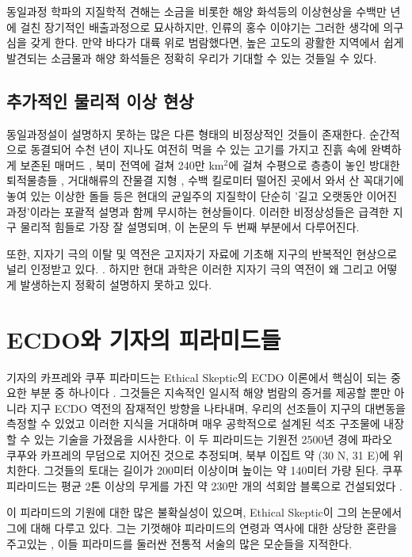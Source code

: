 \documentclass[10pt,twocolumn,letterpaper]{article}
\begin{document}
동일과정 학파의 지질학적 견해는 소금을 비롯한 해양 화석등의 이상현상을 수백만 년에 걸친 장기적인 배출과정으로 묘사하지만, 인류의 홍수 이야기는 그러한 생각에 의구심을 갖게 한다. 만약 바다가 대륙 위로 범람했다면, 높은 고도의 광활한 지역에서 쉽게 발견되는 소금물과 해양 화석들은 정확히 우리가 기대할 수 있는 것들일 수 있다.

\subsection{추가적인 물리적 이상 현상 }

동일과정설이 설명하지 못하는 많은 다른 형태의 비정상적인 것들이 존재한다. 순간적으로 동결되어 수천 년이 지나도 여전히 먹을 수 있는 고기를 가지고 진흙 속에 완벽하게 보존된 매머드 \cite{17,18,19}, 북미 전역에 걸쳐 240만 km$^2$에 걸쳐 수평으로 층층이 놓인 방대한 퇴적물층들  \cite{21}, 거대해류의 잔물결 지형 \cite{22}, 수백 킬로미터 떨어진 곳에서 와서 산 꼭대기에 놓여 있는 이상한 돌들  \cite{23,26} 등은 현대의 균일주의 지질학이 단순히 '길고 오랫동안 이어진 과정'이라는 포괄적 설명과 함께  무시하는 현상들이다. 이러한 비정상성들은 급격한 지구 물리적 힘들로 가장 잘 설명되며, 이 논문의 두 번째 부분에서 다루어진다.

또한, 지자기 극의 이탈 및 역전은 고지자기 자료에 기초해 지구의 반복적인 현상으로 널리 인정받고 있다. \cite{35,40,41}. 하지만 현대 과학은 이러한 지자기 극의 역전이 왜 그리고 어떻게 발생하는지 정확히 설명하지 못하고 있다.

\section{ECDO와 기자의 피라미드들}
기자의 카프레와 쿠푸 피라미드는 Ethical Skeptic의 ECDO 이론에서 핵심이 되는 중요한 부분 중 하나이다 \cite{27}. 그것들은 지속적인 일시적 해양 범람의 증거를 제공할 뿐만 아니라 지구 ECDO 역전의 잠재적인 방향을 나타내며, 우리의 선조들이 지구의 대변동을 측정할 수 있었고 이러한 지식을 거대하며 매우 공학적으로 설계된 석조 구조물에 내장할 수 있는 기술을 가졌음을 시사한다. 이 두 피라미드는 기원전 2500년 경에 파라오 쿠푸와 카프레의 무덤으로 지어진 것으로 추정되며, 북부 이집트 약 (30 N, 31 E)에 위치한다. 그것들의 토대는 길이가 200미터 이상이며 높이는  약 140미터 가량 된다. 쿠푸 피라미드는 평균 2톤 이상의 무게를 가진 약 230만 개의 석회암 블록으로 건설되었다 \cite{24, 25}.

이 피라미드의 기원에 대한 많은 불확실성이 있으며, Ethical Skeptic이 그의 논문에서 그에 대해 다루고 있다. 그는 기껏해야 피라미드의 연령과 역사에 대한 상당한 혼란을 주고있는 , 이들 피라미드를 둘러싼 전통적 서술의 많은 모순들을 지적한다. 
\end{document}

